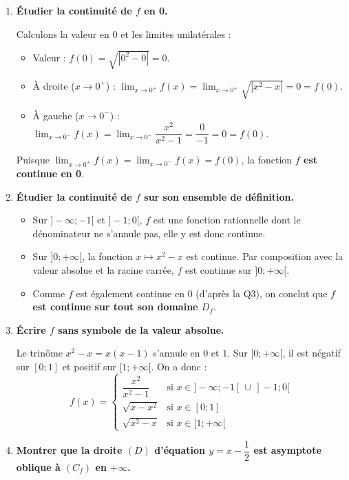 \documentclass[12pt,a4paper]{article}
\begin{document}
\begin{enumerate}
    \item \textbf{Étudier la continuité de $f$ en 0.}
    
    Calculons la valeur en $0$ et les limites unilatérales :
    \begin{itemize}
        \item Valeur : $f(0) = \sqrt{|0^2-0|} = 0$.
        \item À droite ($x \to 0^+$) : $\lim_{x \to 0^+} f(x) = \lim_{x \to 0^+} \sqrt{|x^2-x|} = 0 = f(0)$.
        \item À gauche ($x \to 0^-$) : $\lim_{x \to 0^-} f(x) = \lim_{x \to 0^-} \dfrac{x^2}{x^2-1} = \dfrac{0}{-1} = 0 = f(0)$.
    \end{itemize}
    Puisque $\lim_{x \to 0^+} f(x) = \lim_{x \to 0^-} f(x) = f(0)$, la fonction \textbf{$f$ est continue en 0}.

    \item \textbf{Étudier la continuité de $f$ sur son ensemble de définition.}
    
    \begin{itemize}
        \item Sur $]-\infty; -1[$ et $]-1; 0[$, $f$ est une fonction rationnelle dont le dénominateur ne s'annule pas, elle y est donc continue.
        \item Sur $]0; +\infty[$, la fonction $x \mapsto x^2-x$ est continue. Par composition avec la valeur absolue et la racine carrée, $f$ est continue sur $]0; +\infty[$.
        \item Comme $f$ est également continue en $0$ (d'après la Q3), on conclut que \textbf{$f$ est continue sur tout son domaine $D_f$}.
    \end{itemize}

    \item \textbf{Écrire $f$ sans symbole de la valeur absolue.}
    
    Le trinôme $x^2-x = x(x-1)$ s'annule en $0$ et $1$. Sur $[0; +\infty[$, il est négatif sur $[0; 1]$ et positif sur $[1; +\infty[$. On a donc :
    \[ f(x)=\begin{cases}
    \dfrac{x^{2}}{x^{2}-1} & \text{si } x \in ]-\infty; -1[ \,\cup\, ]-1; 0[ \\ 
    \sqrt{x-x^2} & \text{si } x \in [0; 1] \\
    \sqrt{x^2-x} & \text{si } x \in [1; +\infty[
    \end{cases} \]

    \item \textbf{Montrer que la droite $(D)$ d'équation $y=x-\dfrac{1}{2}$ est asymptote oblique à $(C_{f})$ en $+\infty$.}
    

\end{enumerate}
\end{document}
